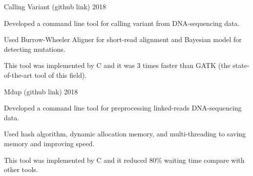 

\begin{cventries}

  \cventry
    {Calling Variant (github link)} %
    {}
    {}
    {2018} %
    {
      \begin{cvitems} %
        \item {Developed a command line tool for calling variant from DNA-sequencing data.}
        \item {Used Burrow-Wheeler Aligner for short-read alignment and Bayesian model for detecting mutations.}
        \item {This tool was implemented by C and it was 3 times faster than GATK (the state-of-the-art tool of this field).}
      \end{cvitems}
    }

  \cventry
    {Mdup (github link)} %
    {}
    {}
    {2018} %
    {
      \begin{cvitems} %
        \item {Developed a command line tool for preprocessing linked-reads DNA-sequencing data.}
        \item {Used hash algorithm, dynamic allocation memory, and multi-threading to saving memory and improving speed.}
        \item {This tool was implemented by C and it reduced 80\% waiting time compare with other tools.}
      \end{cvitems}
    }

\end{cventries}
